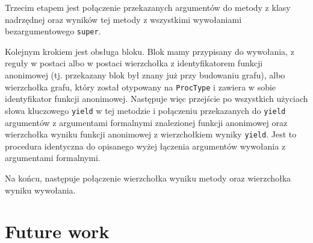 \documentclass[declaration,shortabstract]{iithesis}
\begin{document}
Trzecim etapem jest połączenie przekazanych argumentów do metody z klasy nadrzędnej oraz wyników tej metody z wszystkimi wywołaniami bezargumentowego \texttt{super}.

Kolejnym krokiem jest obsługa bloku. Blok mamy przypisany do wywołania, z reguły w postaci albo w postaci wierzchołka z identyfikatorem funkcji anonimowej (tj. przekazany blok był znany już przy budowaniu grafu), albo wierzchołka grafu, który został otypowany na \texttt{ProcType} i zawiera w sobie identyfikator funkcji anonimowej. Następuje więc przejście po wszystkich użyciach słowa kluczowego \texttt{yield} w tej metodzie i połączeniu przekazanych do \texttt{yield} argumentów z argumentami formalnymi znalezionej funkcji anonimowej oraz wierzchołka wyniku funkcji anonimowej z wierzchołkiem wyniky \texttt{yield}. Jest to procedura identyczna do opisanego wyżej łączenia argumentów wywołania z argumentami formalnymi.

Na końcu, następuje połączenie wierzchołka wyniku metody oraz wierzchołka wyniku wywołania.




\section{Future work}
\end{document}
